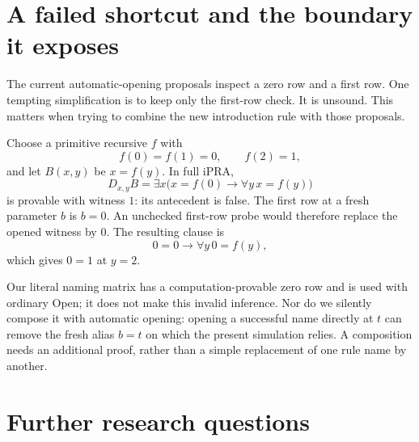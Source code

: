 \documentclass[11pt,letterpaper]{article}
\theoremstyle{definition}\newtheorem{definition}[theorem]{Definition}
\theoremstyle{remark}\newtheorem{remark}[theorem]{Remark}
\begin{document}
\section{A failed shortcut and the boundary it exposes}

The current automatic-opening proposals inspect a zero row and a first row.
One tempting simplification is to keep only the first-row check. It is
unsound. This matters when trying to combine the new introduction rule with
those proposals.

Choose a primitive recursive $f$ with
\[
 f(0)=f(1)=0,\qquad f(2)=1,
\]
and let $B(x,y)$ be $x=f(y)$. In full iPRA,
\[
 D_{x,y}B=\exists x\bigl(x=f(0)\to\forall y\,x=f(y)\bigr)
\]
is provable with witness $1$: its antecedent is false. The first row at a
fresh parameter $b$ is $b=0$. An unchecked first-row probe would therefore
replace the opened witness by $0$. The resulting clause is
\[
 0=0\to\forall y\,0=f(y),
\]
which gives $0=1$ at $y=2$.

Our literal naming matrix has a computation-provable zero row and is used
with ordinary Open; it does not make this invalid inference. Nor do we
silently compose it with automatic opening: opening a successful name
directly at $t$ can remove the fresh alias $b=t$ on which the present
simulation relies. A composition needs an additional proof, rather than a
simple replacement of one rule name by another.

\section{Further research questions}
\end{document}
